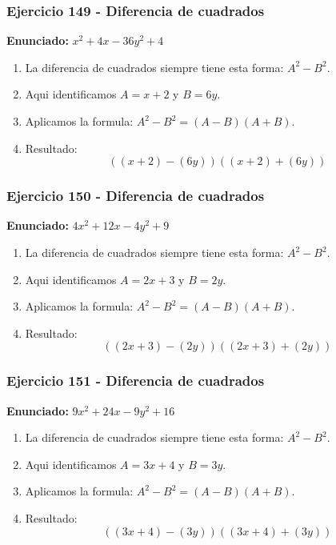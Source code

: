 \documentclass[11pt,a4paper]{article}
\begin{document}
\vspace{0.2cm}
\subsubsection*{Ejercicio 149 - Diferencia de cuadrados}
\textbf{Enunciado:} $ x^{2} + 4 x - 36 y^{2} + 4 $\par
\begin{enumerate}[leftmargin=2em]
\item La diferencia de cuadrados siempre tiene esta forma: \(A^2-B^2\).
\item Aqui identificamos \(A=x + 2\) y \(B=6 y\).
\item Aplicamos la formula: \(A^2-B^2=(A-B)(A+B)\).
\item Resultado: \[\boxed{\left(\left(x + 2\right)-\left(6 y\right)\right)\left(\left(x + 2\right)+\left(6 y\right)\right)}\]
\end{enumerate}

\vspace{0.2cm}
\subsubsection*{Ejercicio 150 - Diferencia de cuadrados}
\textbf{Enunciado:} $ 4 x^{2} + 12 x - 4 y^{2} + 9 $\par
\begin{enumerate}[leftmargin=2em]
\item La diferencia de cuadrados siempre tiene esta forma: \(A^2-B^2\).
\item Aqui identificamos \(A=2 x + 3\) y \(B=2 y\).
\item Aplicamos la formula: \(A^2-B^2=(A-B)(A+B)\).
\item Resultado: \[\boxed{\left(\left(2 x + 3\right)-\left(2 y\right)\right)\left(\left(2 x + 3\right)+\left(2 y\right)\right)}\]
\end{enumerate}

\vspace{0.2cm}
\subsubsection*{Ejercicio 151 - Diferencia de cuadrados}
\textbf{Enunciado:} $ 9 x^{2} + 24 x - 9 y^{2} + 16 $\par
\begin{enumerate}[leftmargin=2em]
\item La diferencia de cuadrados siempre tiene esta forma: \(A^2-B^2\).
\item Aqui identificamos \(A=3 x + 4\) y \(B=3 y\).
\item Aplicamos la formula: \(A^2-B^2=(A-B)(A+B)\).
\item Resultado: \[\boxed{\left(\left(3 x + 4\right)-\left(3 y\right)\right)\left(\left(3 x + 4\right)+\left(3 y\right)\right)}\]
\end{enumerate}
\end{document}
